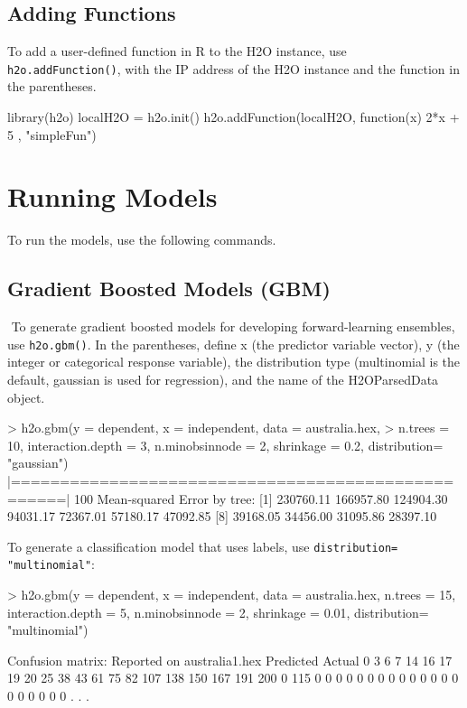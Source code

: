 \documentclass[11pt]{article}
\begin{document}
\subsection{Adding Functions}

To add a user-defined function in R to the H2O instance, use {\texttt{h2o.addFunction()}}, with the IP address of the H2O instance and the function in the parentheses.  
\begin{spverbatim}
library(h2o)
localH2O = h2o.init()
h2o.addFunction(localH2O, function(x) { 2*x + 5 }, "simpleFun")
\end{spverbatim}


\section{Running Models}

To run the models, use the following commands. 
\subsection{Gradient Boosted Models (GBM)}
 To generate gradient boosted models for developing forward-learning ensembles, use {\texttt{h2o.gbm()}}.  In the parentheses, define x (the predictor variable vector), y (the integer or categorical response variable), the distribution type (multinomial is the default, gaussian is used for regression), and the name of the H2OParsedData object. 
\begin{spverbatim}
> h2o.gbm(y = dependent, x = independent, data = australia.hex,
> n.trees = 10, interaction.depth = 3,
   n.minobsinnode = 2, shrinkage = 0.2, distribution= "gaussian")
     |===================================================| 100%
 Mean-squared Error by tree:
  [1] 230760.11 166957.80 124904.30  94031.17  72367.01  57180.17  47092.85
  [8]  39168.05  34456.00  31095.86  28397.10

\end{spverbatim}

To generate a classification model that uses labels, use {\texttt{distribution= "multinomial"}}: 
\begin{spverbatim}
> h2o.gbm(y = dependent, x = independent, data = australia.hex, n.trees
= 15, interaction.depth = 5,
 n.minobsinnode = 2, shrinkage = 0.01, distribution= "multinomial")
   
Confusion matrix:
Reported on australia1.hex
Predicted
Actual     0 3 6 7 14 16 17 19 20 25 38 43 61 75 82 107 138 150 167 191 200
  0      115 0 0 0  0  0  0  0  0  0  0  0  0  0  0   0   0   0   0   0   0
. . .
\end{spverbatim}
\end{document}
